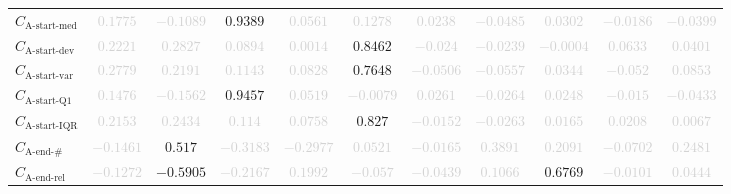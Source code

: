 \documentclass{standalone}
\newcommand{\startmedianname}{\text{A-start-med}}
\newcommand{\startmedian}{C_{\startmedianname}}
\newcommand{\startdevname}{\text{A-start-dev}}
\newcommand{\startdev}{C_{\startdevname}}
\newcommand{\startvarname}{\text{A-start-var}}
\newcommand{\startvar}{C_{\startvarname}}
\newcommand{\startqonename}{\text{A-start-Q1}}
\newcommand{\startqone}{C_{\startqonename}}
\newcommand{\startiqrname}{\text{A-start-IQR}}
\newcommand{\startiqr}{C_{\startiqrname}}
\newcommand{\lastactivitiesname}{\text{A-end-\#}}
\newcommand{\lastactivities}{C_{\lastactivitiesname}}
\newcommand{\lastactivitiesrelname}{\text{A-end-rel}}
\newcommand{\lastactivitiesrel}{C_{\lastactivitiesrelname}}
\begin{document}
\begin{tabular}{lcccccccccc}
$\startmedian$ & \textcolor{lightgray}{$0.1775$} & \textcolor{lightgray}{$-0.1089$} & $0.9389$ & \textcolor{lightgray}{$0.0561$} & \textcolor{lightgray}{$0.1278$} & \textcolor{lightgray}{$0.0238$} & \textcolor{lightgray}{$-0.0485$} & \textcolor{lightgray}{$0.0302$} & \textcolor{lightgray}{$-0.0186$} & \textcolor{lightgray}{$-0.0399$} \\ 
$\startdev$ & \textcolor{lightgray}{$0.2221$} & \textcolor{lightgray}{$0.2827$} & \textcolor{lightgray}{$0.0894$} & \textcolor{lightgray}{$0.0014$} & $0.8462$ & \textcolor{lightgray}{$-0.024$} & \textcolor{lightgray}{$-0.0239$} & \textcolor{lightgray}{$-0.0004$} & \textcolor{lightgray}{$0.0633$} & \textcolor{lightgray}{$0.0401$} \\ 
$\startvar$ & \textcolor{lightgray}{$0.2779$} & \textcolor{lightgray}{$0.2191$} & \textcolor{lightgray}{$0.1143$} & \textcolor{lightgray}{$0.0828$} & $0.7648$ & \textcolor{lightgray}{$-0.0506$} & \textcolor{lightgray}{$-0.0557$} & \textcolor{lightgray}{$0.0344$} & \textcolor{lightgray}{$-0.052$} & \textcolor{lightgray}{$0.0853$} \\ 
$\startqone$ & \textcolor{lightgray}{$0.1476$} & \textcolor{lightgray}{$-0.1562$} & $0.9457$ & \textcolor{lightgray}{$0.0519$} & \textcolor{lightgray}{$-0.0079$} & \textcolor{lightgray}{$0.0261$} & \textcolor{lightgray}{$-0.0264$} & \textcolor{lightgray}{$0.0248$} & \textcolor{lightgray}{$-0.015$} & \textcolor{lightgray}{$-0.0433$} \\ 
$\startiqr$ & \textcolor{lightgray}{$0.2153$} & \textcolor{lightgray}{$0.2434$} & \textcolor{lightgray}{$0.114$} & \textcolor{lightgray}{$0.0758$} & $0.827$ & \textcolor{lightgray}{$-0.0152$} & \textcolor{lightgray}{$-0.0263$} & \textcolor{lightgray}{$0.0165$} & \textcolor{lightgray}{$0.0208$} & \textcolor{lightgray}{$0.0067$} \\ 
$\lastactivities$ & \textcolor{lightgray}{$-0.1461$} & $0.517$ & \textcolor{lightgray}{$-0.3183$} & \textcolor{lightgray}{$-0.2977$} & \textcolor{lightgray}{$0.0521$} & \textcolor{lightgray}{$-0.0165$} & \textcolor{lightgray}{$0.3891$} & \textcolor{lightgray}{$0.2091$} & \textcolor{lightgray}{$-0.0702$} & \textcolor{lightgray}{$0.2481$} \\ 
$\lastactivitiesrel$ & \textcolor{lightgray}{$-0.1272$} & $-0.5905$ & \textcolor{lightgray}{$-0.2167$} & \textcolor{lightgray}{$0.1992$} & \textcolor{lightgray}{$-0.057$} & \textcolor{lightgray}{$-0.0439$} & \textcolor{lightgray}{$0.1066$} & $0.6769$ & \textcolor{lightgray}{$-0.0101$} & \textcolor{lightgray}{$0.0444$} \\ 

\end{tabular}
\end{document}
